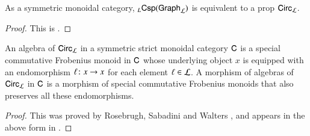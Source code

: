 \documentclass[reqno]{amsart}
\begin{document}
\begin{lem} As a symmetric monoidal category, ${}_L \mathsf{Csp}(\mathsf{Graph}_{\mathcal{L}})$ is equivalent to a prop $\mathsf{Circ}_{\mathcal{L}}$.    
\end{lem}

\begin{proof}
This is \cite[Proposition 4.3]{BCR}.
\end{proof}

\begin{prop} 
\label{prop:LCirc_algebra}
An algebra of $\mathsf{Circ}_{\mathcal{L}}$ in a symmetric strict monoidal category $\mathsf{C}$ is a 
special commutative Frobenius monoid in $\mathsf{C}$ whose underlying object $x$ is equipped
with an endomorphism $\ell \colon x \to x$ for each element $\ell \in \mathcal{L}$. 
A morphism of algebras of $\mathsf{Circ}_{\mathcal{L}}$ in $\mathsf{C}$ is a morphism of special commutative Frobenius monoids that also preserves all these endomorphisms.
\end{prop}

\begin{proof}
This was proved by Rosebrugh, Sabadini and Walters \cite{RSW}, and appears
in the above form in \cite[Proposition 7.2]{BCR}.  
\end{proof}
\end{document}
